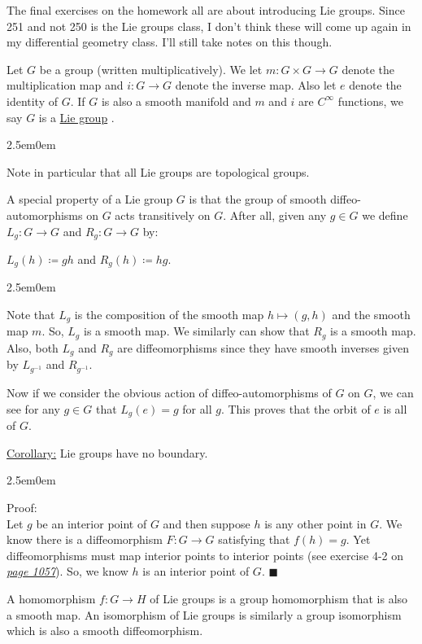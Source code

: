 \documentclass{book}
\newcommand{\inLinkRap}[2]{{\color{blue}\hyperlink{#1}{\textit{#2}}}}
\newcommand{\hTwo}{%
\color{Black}%
   \fontsize{13}{15}\selectfont%
}
\newcommand{\myComment}{%
   \color{RawerSienna}%
   \fontsize{12}{14}\selectfont%
}
\newcommand{\pracTwo}{
   \color{Orange}%
   \fontsize{12}{14}\selectfont%
}
\newcommand{\exTwo}{%
   \color{Purple}%
   \fontsize{13}{15}\selectfont%
}
\newcommand{\exThreeP}{%
   \color{RedViolet}%
   \fontsize{12}{14}\selectfont%
}
\newenvironment{myIndent}{%
   \begin{adjustwidth}{2.5em}{0em}%
}{%
   \end{adjustwidth}%
}
\newcommand{\udefine}[1]{{%
   \setulcolor{Red}%
   \setul{0.14em}{0.07em}%
   \ul{#1}%
}}
\newcommand{\retTwo}{\hfill\bigbreak}
\begin{document}
\hTwo The final exercises on the homework all are about introducing Lie groups. Since 251 and not 250 is the Lie groups class, I don't think these will come up again in my differential geometry class. I'll still take notes on this though.\retTwo

Let $G$ be a group (written multiplicatively). We let $m: G \times G \to G$ denote the\\ multiplication map and $i: G \to G$ denote the inverse map. Also let $e$ denote the identity of $G$. If $G$ is also a smooth manifold and $m$ and $i$ are $C^\infty$ functions, we say $G$ is a \udefine{Lie group}.
\begin{myIndent}\myComment
	Note in particular that all Lie groups are topological groups.\newpage
\end{myIndent}

A special property of a Lie group $G$ is that the group of smooth diffeo-automorphisms on $G$ acts transitively on $G$. After all, given any $g \in G$ we define $L_g : G \to G$ and $R_g : G \to G$ by:

{\centering$L_g(h) \coloneqq gh$ and $R_g(h) \coloneqq hg$.\retTwo\par}

\begin{myIndent}\pracTwo
	Note that $L_g$ is the composition of the smooth map $h  \mapsto (g, h)$ and the smooth map $m$. So, $L_g$ is a smooth map. We similarly can show that $R_g$ is a smooth map. Also, both $L_g$ and $R_g$ are diffeomorphisms since they have smooth inverses given by $L_{g^{-1}}$ and $R_{g^{-1}}$.\retTwo
\end{myIndent}

Now if we consider the obvious action of diffeo-automorphisms of $G$ on $G$, we can see for any $g \in G$ that $L_g(e) = g$ for all $g$. This proves that the orbit of $e$ is all of $G$.\retTwo


\exTwo\ul{Corollary:} Lie groups have no boundary.
\begin{myIndent}\exThreeP
	Proof:\\
	Let $g$ be an interior point of $G$ and then suppose $h$ is any other point in $G$. We know there is a diffeomorphism $F: G \to G$ satisfying that $f(h) = g$. Yet diffeomorphisms must map interior points to interior points (see exercise 4-2 on \inLinkRap{Exercise 4-2 page 1057}{page 1057}). So, we know $h$ is an interior point of $G$. $\blacksquare$\retTwo
\end{myIndent}

\hTwo A homomorphism $f: G \to H$ of Lie groups is a group homomorphism that is also a smooth map. An isomorphism of Lie groups is similarly a group isomorphism which is also a smooth diffeomorphism.\retTwo
\end{document}
